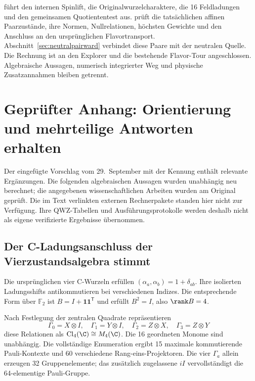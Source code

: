  führt den internen Spinlift, die Originalwurzelcharaktere, die 16 Feldladungen und den gemeinsamen Quotiententest aus.  prüft die tatsächlichen affinen Paarzustände, ihre Normen, Nullrelationen, höchsten Gewichte und den Anschluss an den ursprünglichen Flavortransport. Abschnitt~\ref{sec:neutralpairward} verbindet diese Paare mit der neutralen Quelle. Die Rechnung ist an den Explorer und die bestehende Flavor-Tour angeschlossen. Algebraische Aussagen, numerisch integrierter Weg und physische Zusatzannahmen bleiben getrennt.

\section{Geprüfter Anhang: Orientierung und mehrteilige Antworten erhalten}\label{sec:orientationaudit}

Der eingefügte Vorschlag vom 29.~September mit der Kennung  enthält relevante Ergänzungen. Die folgenden algebraischen Aussagen wurden unabhängig neu berechnet; die angegebenen wissenschaftlichen Arbeiten wurden am Original geprüft. Die im Text verlinkten externen Rechnerpakete standen hier nicht zur Verfügung. Ihre QWZ-Tabellen und Ausführungsprotokolle werden deshalb nicht als eigene verifizierte Ergebnisse übernommen.

\subsection{Der C-Ladungsanschluss der Vierzustandsalgebra stimmt}
Die ursprünglichen vier C-Wurzeln erfüllen $(\alpha_a,\alpha_b)=1+\delta_{ab}$. Ihre isolierten Ladungsshifts antikommutieren bei verschiedenen Indizes. Die entsprechende Form über $\mathbb F_2$ ist $B=I+\mathbf1\mathbf1^{\mathsf T}$ und erfüllt $B^2=I$, also $\rank B=4$.

Nach Festlegung der zentralen Quadrate repräsentieren
\begin{equation}
\Gamma_0=X\otimes I,\quad \Gamma_1=Y\otimes I,\quad
\Gamma_2=Z\otimes X,\quad \Gamma_3=Z\otimes Y
\end{equation}
diese Relationen als $\mathrm{Cl}_4(\C)\cong M_4(\C)$. Die 16 geordneten Monome sind unabhängig. Die vollständige Enumeration ergibt 15 maximale kommutierende Pauli-Kontexte und 60 verschiedene Rang-eins-Projektoren. Die vier $\Gamma_a$ allein erzeugen 32 Gruppenelemente; das zusätzlich zugelassene $iI$ vervollständigt die 64-elementige Pauli-Gruppe.

